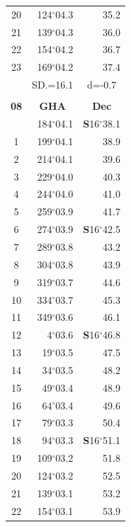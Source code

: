 \documentclass[10pt, a4paper]{report}
\begin{document}
\begin{scriptsize}
\begin{tabular*}{0.2\textwidth}[t]{@{\extracolsep{\fill}}|c|rr|}
20 & 124$^\circ$04.3 & 35.2\\
21 & 139$^\circ$04.3 & \raisebox{0.24ex}{\boldmath$\cdot$~\boldmath$\cdot$~~}36.0\\
22 & 154$^\circ$04.2 & 36.7\\
23 & 169$^\circ$04.2 & 37.4\\
\hline
\rule{0pt}{2.4ex} & \multicolumn{1}{c}{SD.=16.1} & \multicolumn{1}{c|}{d=-0.7}\\
\hline
\multicolumn{1}{c}{}\\[-0.5ex]\hline
\multicolumn{1}{|c|}{\rule{0pt}{2.6ex}\textbf{08}} & \multicolumn{1}{c}{\textbf{GHA}} & \multicolumn{1}{c|}{\textbf{Dec}}\\
\hline\rule{0pt}{2.6ex}\noindent
0 & 184$^\circ$04.1 & \textbf{S}16$^\circ$38.1\\
1 & 199$^\circ$04.1 & 38.9\\
2 & 214$^\circ$04.1 & 39.6\\
3 & 229$^\circ$04.0 & \raisebox{0.24ex}{\boldmath$\cdot$~\boldmath$\cdot$~~}40.3\\
4 & 244$^\circ$04.0 & 41.0\\
5 & 259$^\circ$03.9 & 41.7\\[2Pt]
6 & 274$^\circ$03.9 & \textbf{S}16$^\circ$42.5\\
7 & 289$^\circ$03.8 & 43.2\\
8 & 304$^\circ$03.8 & 43.9\\
9 & 319$^\circ$03.7 & \raisebox{0.24ex}{\boldmath$\cdot$~\boldmath$\cdot$~~}44.6\\
10 & 334$^\circ$03.7 & 45.3\\
11 & 349$^\circ$03.6 & 46.1\\[2Pt]
12 & 4$^\circ$03.6 & \textbf{S}16$^\circ$46.8\\
13 & 19$^\circ$03.5 & 47.5\\
14 & 34$^\circ$03.5 & 48.2\\
15 & 49$^\circ$03.4 & \raisebox{0.24ex}{\boldmath$\cdot$~\boldmath$\cdot$~~}48.9\\
16 & 64$^\circ$03.4 & 49.6\\
17 & 79$^\circ$03.3 & 50.4\\[2Pt]
18 & 94$^\circ$03.3 & \textbf{S}16$^\circ$51.1\\
19 & 109$^\circ$03.2 & 51.8\\
20 & 124$^\circ$03.2 & 52.5\\
21 & 139$^\circ$03.1 & \raisebox{0.24ex}{\boldmath$\cdot$~\boldmath$\cdot$~~}53.2\\
22 & 154$^\circ$03.1 & 53.9\\

\end{tabular*}
\end{scriptsize}
\end{document}
